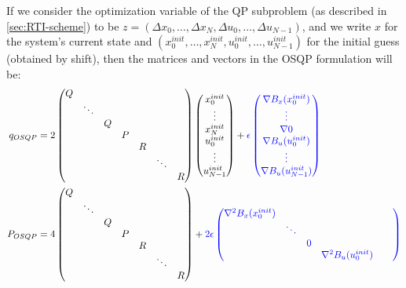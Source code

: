 \documentclass[12pt]{article}
\begin{document}
If we consider the optimization variable of the QP subproblem (as described in \ref{sec:RTI-scheme}) to be $z=(\Delta x_0,\dots,\Delta x_N,\Delta u_0, \dots,\Delta u_{N-1})$, and we write $x$ for the system's current state and  $(x_0^{init},\dots,x_{N}^{init},u_0^{init},\dots,u_{N-1}^{init})$ for the initial guess (obtained by shift), then the matrices and vectors in the OSQP formulation will be:
\scriptsize
\begin{align*}
	\begin{split}
		q_{OSQP}&=2\begin{pmatrix}
			Q&&&&&&\\
			&\ddots&&&&&\\
			&&Q&&&&\\
			&&&P&&&\\
			&&&&R&&\\
			&&&&&\ddots&\\
			&&&&&&R
		\end{pmatrix}\begin{pmatrix}
			x_0^{init}\\\vdots\\x_N^{init}\\u_0^{init}\\\vdots\\u_{N-1}^{init}
		\end{pmatrix}+\color{blue}\epsilon\begin{pmatrix}
			\nabla B_x(x_0^{init})\\\vdots\\\nabla 0\\\nabla B_u(u_0^{init})\\\vdots\\\nabla B_u(u_{N-1}^{init})
		\end{pmatrix}\color{black}\\
		P_{OSQP}&=4\begin{pmatrix}
			Q&&&&&&\\
			&\ddots&&&&&\\
			&&Q&&&&\\
			&&&P&&&\\
			&&&&R&&\\
			&&&&&\ddots&\\
			&&&&&&R
		\end{pmatrix}+\color{blue}2\epsilon\begin{pmatrix}
			\nabla^2B_x(x_0^{init})&&&&&\\
			&\ddots&&&&\\
			&&0&&&\\
			&&&\nabla^2B_u(u_0^{init})&&\\

\end{pmatrix}
\end{split}
\end{align*}
\end{document}
